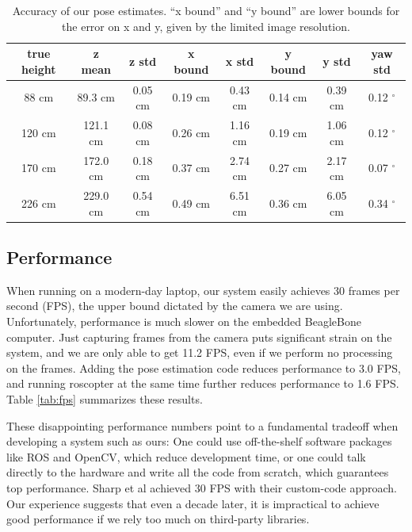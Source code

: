 \documentclass[10pt]{scrartcl} %
\begin{document}
\begin{table}[h!]
    \centering
    \begin{tabular}{c|cc|cc|cc|c}
        true height & z mean    & z std     & x bound   & x std     & y bound   & y std     & yaw std \\
        \hline
         88 cm      & 89.3 cm   & 0.05 cm   & 0.19 cm   & 0.43 cm   & 0.14 cm   & 0.39 cm   & 0.12 $^{\circ}$ \\
        120 cm      & 121.1 cm  & 0.08 cm   & 0.26 cm   & 1.16 cm   & 0.19 cm   & 1.06 cm   & 0.12 $^{\circ}$ \\
        170 cm      & 172.0 cm  & 0.18 cm   & 0.37 cm   & 2.74 cm   & 0.27 cm   & 2.17 cm   & 0.07 $^{\circ}$ \\
        226 cm      & 229.0 cm  & 0.54 cm   & 0.49 cm   & 6.51 cm   & 0.36 cm   & 6.05 cm   & 0.34 $^{\circ}$ \\
    \end{tabular}
    \caption{
        Accuracy of our pose estimates. ``x bound'' and ``y bound'' are lower
        bounds for the error on x and y, given by the limited image resolution.
    }
    \label{tab:pose-accu}
\end{table}

\subsection{Performance}

When running on a modern-day laptop, our system easily achieves 30 frames per
second (FPS), the upper bound dictated by the camera we are using.
Unfortunately, performance is much slower on the embedded BeagleBone computer.
Just capturing frames from the camera puts significant strain on the system,
and we are only able to get 11.2 FPS, even if we perform no processing on the
frames. Adding the pose estimation code reduces performance to 3.0 FPS, and
running roscopter at the same time further reduces performance to 1.6 FPS.
Table \ref{tab:fps} summarizes these results.

These disappointing performance numbers point to a fundamental tradeoff when
developing a system such as ours: One could use off-the-shelf software packages
like ROS and OpenCV, which reduce development time, or one could talk directly
to the hardware and write all the code from scratch, which guarantees top
performance. Sharp et al \cite{sharp_et_al_2001} achieved 30 FPS with their
custom-code approach. Our experience suggests that even a decade later, it is
impractical to achieve good performance if we rely too much on third-party
libraries.
\end{document}
